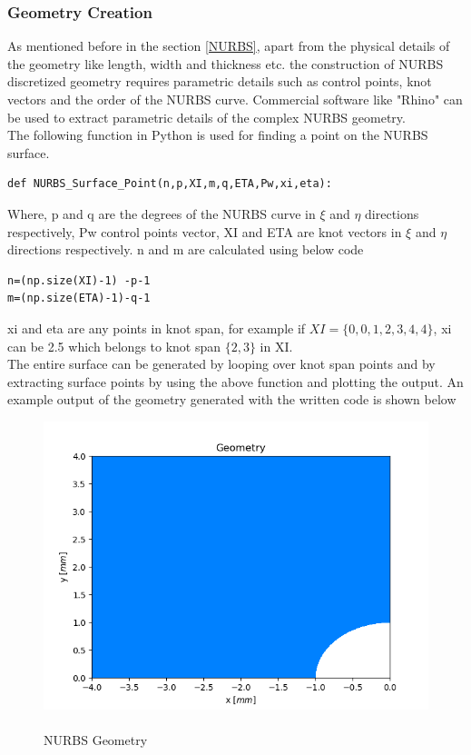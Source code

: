 \documentclass[11pt]{article}
\begin{document}
\subsubsection{Geometry Creation} \label{GeometryCreation}
As mentioned before in the section \ref{NURBS}, apart from the physical details of the geometry like length, width and thickness etc. the construction of NURBS discretized geometry requires parametric details such as control points, knot vectors and the order of the NURBS curve. Commercial software like "Rhino" can be used to extract parametric details of the complex NURBS geometry. \\ The following function in Python is used for finding a point on the NURBS surface.
\begin{verbatim}
def NURBS_Surface_Point(n,p,XI,m,q,ETA,Pw,xi,eta):
\end{verbatim}
Where, p and q are the degrees of the NURBS curve in $\xi$ and $\eta$ directions respectively, Pw control points vector, XI and ETA are knot vectors in $\xi$ and $\eta$ directions respectively. 
n and m are calculated using below code
\begin{verbatim}
n=(np.size(XI)-1) -p-1
m=(np.size(ETA)-1)-q-1 
\end{verbatim}
xi and eta are any points in knot span, for example if 
$XI = \{0,0,1,2,3,4,4\}$,
xi can be 2.5 which belongs to knot span $\{2,3\}$ in XI.\\
The entire surface can be generated by looping over knot span points and by extracting surface points by using the above function and plotting the output. 
An example output of the geometry generated with the written code is shown below
\begin{figure}[H]
	\begin{center}
		\includegraphics[scale=0.6]{Geometry.png} 
		\caption{\\NURBS Geometry}\label{Geometry}
	\end{center}	
\end{figure}
\end{document}
